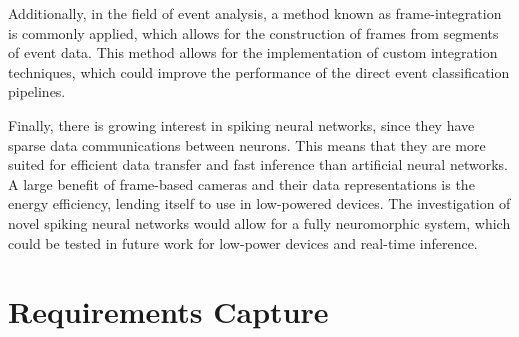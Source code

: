 
Additionally, in the field of event analysis, a method known as frame-integration is commonly applied, which allows for the construction of frames from segments of event data. This method allows for the implementation of custom integration techniques, which could improve the performance of the direct event classification pipelines.

Finally, there is growing interest in spiking neural networks, since they have sparse data communications between neurons. This means that they are more suited for efficient data transfer and fast inference than artificial neural networks. A large benefit of frame-based cameras and their data representations is the energy efficiency, lending itself to use in low-powered devices. The investigation of novel spiking neural networks would allow for a fully neuromorphic system, which could be tested in future work for low-power devices and real-time inference.

\section{Requirements Capture} \label{sec:requirements_capture}


